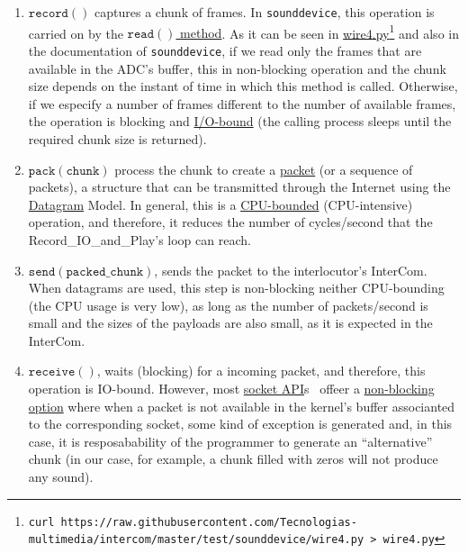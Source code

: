 \begin{enumerate}
\item $\mathtt{record()}$ captures a chunk of frames. In
  \texttt{sounddevice}, this operation is carried on by the
  \href{https://python-sounddevice.readthedocs.io/en/0.4.0/api/streams.html#sounddevice.Stream.read}{$\mathtt{read()}$
    method}. As it can be seen in
  \href{https://raw.githubusercontent.com/Tecnologias-multimedia/intercom/master/test/sounddevice/wire4.py}{wire4.py}\footnote{
  \texttt{curl
    https://raw.githubusercontent.com/Tecnologias-multimedia/intercom/master/test/sounddevice/wire4.py
    > wire4.py}} and also in the documentation of
  \texttt{sounddevice}, if we read only the frames that are available
  in the ADC's buffer, this in non-blocking operation and the chunk
  size depends on the instant of time in which this method is
  called. Otherwise, if we especify a number of frames different to
  the number of available frames, the operation is blocking and
  \href{https://en.wikipedia.org/wiki/I/O_bound}{I/O-bound} (the
  calling process sleeps until the required chunk size is returned).

\item $\mathtt{pack(chunk)}$ process the chunk to create a
  \href{https://en.wikipedia.org/wiki/Network_packet}{packet} (or a
  sequence of packets), a structure that can be transmitted through
  the Internet using the
  \href{https://en.wikipedia.org/wiki/Datagram}{Datagram} Model. In
  general, this is a
  \href{https://en.wikipedia.org/wiki/CPU-bound}{CPU-bounded}
  (CPU-intensive) operation, and therefore, it reduces the number of
  cycles/second that the Record\_IO\_and\_Play's loop can reach.

\item $\mathtt{send(packed\_chunk)}$, sends the packet to the
  interlocutor's InterCom. When datagrams are used, this step is
  non-blocking neither CPU-bounding (the CPU usage is very low), as
  long as the number of packets/second is small and the sizes of the
  payloads are also small, as it is expected in the InterCom.

\item $\mathtt{receive()}$, waits (blocking) for a incoming packet,
  and therefore, this operation is IO-bound. However, most
  \href{https://docs.python.org/3/library/socket.html}{socket
    API}s~\cite{python} offeer a
  \href{https://docs.python.org/3.8/library/socket.html#socket.socket.setblocking}{non-blocking
    option} where when a packet is not available in the kernel's
  buffer associanted to the corresponding socket, some kind of
  exception is generated and, in this case, it is resposabability of
  the programmer to generate an ``alternative'' chunk (in our case, for
  example, a chunk filled with zeros will not produce any sound).


\end{enumerate}
